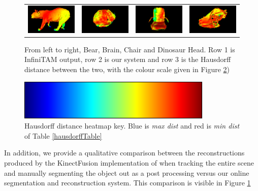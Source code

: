 \begin{figure}[!t]
\begin{tabular}{cccc}
		\includegraphics[width=3cm]{hausdorff/bear.png}&
		\includegraphics[width=3cm]{hausdorff/brain.png}&
		\includegraphics[width=3cm]{hausdorff/chair.png}&
		\includegraphics[width=3cm]{hausdorff/dino.png}\\
	\end{tabular}
	\vspace{-3mm}
	\caption{
		From left to right, Bear, Brain, Chair and Dinosaur Head. Row 1 is InfiniTAM output, row 2 is our system and row 3 is the Hausdorff distance between the two, with the colour scale 
		given in Figure \ref{fig:colour_range})
	}
	\vspace{-5mm}
	\label{fig:demo}
\end{figure}

\begin{figure}
	\centering
	\includegraphics[scale=0.5]{hausdorff/colour_range.png}
	\caption{Hausdorff distance heatmap key. Blue is \textit{max dist} and red is \textit{min dist} of Table \ref{hausdorffTable}}
	\label{fig:colour_range}
\end{figure}

In addition, we provide a qualitative comparison between the reconstructions produced by the KinectFusion implementation of \cite{Prisacariu2014} when 
tracking the entire scene and manually segmenting the object out as a post processing versus our online segmentation and reconstruction system. This 
comparison is visible in Figure \ref{fig:demo}

